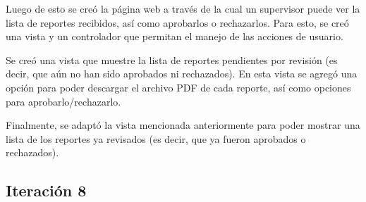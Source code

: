 Luego de esto se creó la página web a través de la cual un supervisor puede ver la lista de reportes recibidos, así como aprobarlos o rechazarlos. Para esto, se creó una vista y un controlador que permitan el manejo de las acciones de usuario.

Se creó una vista que muestre la lista de reportes pendientes por revisión (es decir, que aún no han sido aprobados ni rechazados). En esta vista se agregó una opción para poder descargar el archivo PDF de cada reporte, así como opciones para aprobarlo/rechazarlo.

Finalmente, se adaptó la vista mencionada anteriormente para poder mostrar una lista de los reportes ya revisados (es decir, que ya fueron aprobados o rechazados).

\subsection{Iteración 8}
